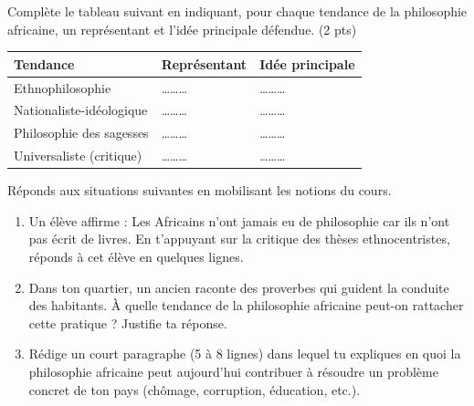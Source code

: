 \documentclass[11pt]{article}
\begin{document}
\begin{exercice}
Complète le tableau suivant en indiquant, pour chaque tendance de la philosophie africaine, un représentant et l'idée principale défendue. \hfill (2 pts)

\begin{center}
\begin{tabular}{|p{4cm}|p{4cm}|p{6cm}|}
\hline
\textbf{Tendance} & \textbf{Représentant} & \textbf{Idée principale} \\
\hline
Ethnophilosophie & \ldots\ldots\ldots & \ldots\ldots\ldots \\
\hline
Nationaliste-idéologique & \ldots\ldots\ldots & \ldots\ldots\ldots \\
\hline
Philosophie des sagesses & \ldots\ldots\ldots & \ldots\ldots\ldots \\
\hline
Universaliste (critique) & \ldots\ldots\ldots & \ldots\ldots\ldots \\
\hline
\end{tabular}
\end{center}
\end{exercice}

\begin{exercice}
Réponds aux situations suivantes en mobilisant les notions du cours.
\begin{enumerate}
  \item Un élève affirme : \og Les Africains n'ont jamais eu de philosophie car ils n'ont pas écrit de livres. \fg{} En t'appuyant sur la critique des thèses ethnocentristes, réponds à cet élève en quelques lignes.
  \item Dans ton quartier, un ancien raconte des proverbes qui guident la conduite des habitants. À quelle tendance de la philosophie africaine peut-on rattacher cette pratique ? Justifie ta réponse.
  \item Rédige un court paragraphe (5 à 8 lignes) dans lequel tu expliques en quoi la philosophie africaine peut aujourd'hui contribuer à résoudre un problème concret de ton pays (chômage, corruption, éducation, etc.).
\end{enumerate}
\end{exercice}
\end{document}
